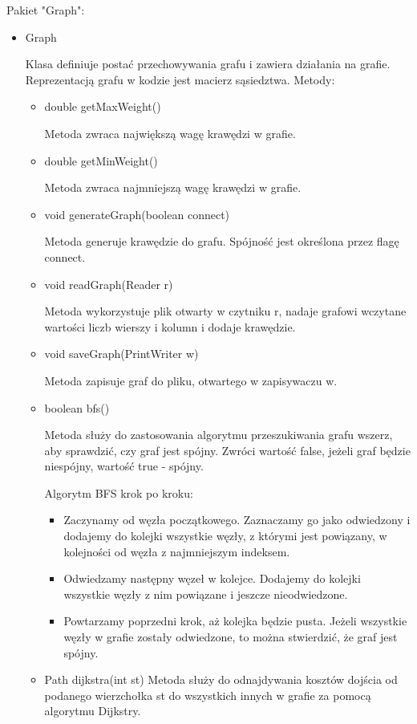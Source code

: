 \documentclass[]{article}
\begin{document}
Pakiet "Graph":
\begin{itemize}
    \item Graph
    
    Klasa definiuje postać przechowywania grafu i zawiera działania na grafie.  Reprezentacją grafu w kodzie jest macierz sąsiedztwa.
    Metody:
    \begin{itemize}
        \item double getMaxWeight()
        
        Metoda zwraca największą wagę krawędzi w grafie.
        \item double getMinWeight()
        
        Metoda zwraca najmniejszą wagę krawędzi w grafie.
        \item void generateGraph(boolean connect)
        
        Metoda generuje krawędzie do grafu. Spójność jest określona przez flagę connect.
        \item void readGraph(Reader r)
        
        Metoda wykorzystuje plik otwarty w czytniku r, nadaje grafowi wczytane wartości liczb wierszy i kolumn i dodaje krawędzie.
        \item void saveGraph(PrintWriter w)
        
        Metoda zapisuje graf do pliku, otwartego w zapisywaczu w.
        \item boolean bfs()
        
        Metoda służy do zastosowania algorytmu przeszukiwania grafu wszerz, aby sprawdzić, czy graf jest spójny. Zwróci wartość false, jeżeli graf będzie niespójny, wartość true - spójny.
        
        Algorytm BFS krok po kroku:
        \begin{itemize}
            \item Zaczynamy od węzła początkowego. Zaznaczamy go jako odwiedzony i dodajemy do kolejki wszystkie węzły, z którymi jest powiązany, w kolejności od węzła z najmniejszym indeksem.
            \item Odwiedzamy następny węzeł w kolejce. Dodajemy do kolejki wszystkie węzły z nim powiązane i jeszcze nieodwiedzone.
            \item Powtarzamy poprzedni krok, aż kolejka będzie pusta. Jeżeli wszystkie węzły w grafie zostały odwiedzone, to można stwierdzić, że graf jest spójny.
        \end{itemize}
        \item Path dijkstra(int st)
        Metoda służy do odnajdywania kosztów dojścia od podanego wierzchołka st do wszystkich innych w grafie za pomocą algorytmu Dijkstry.
        

\end{itemize}
\end{itemize}
\end{document}
